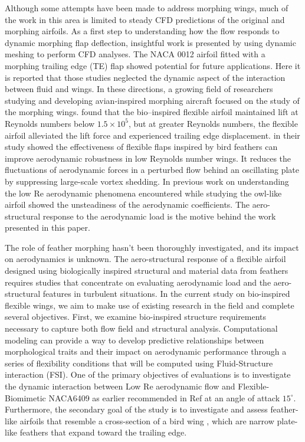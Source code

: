 \documentclass[conf]{new-aiaa}
\begin{document}
Although some attempts have been made to address morphing wings, much of the work in this area is limited to steady CFD predictions of the original and morphing airfoils.
%
As a first step to understanding how the flow responds to dynamic morphing flap deflection,  insightful work is presented by \cite{abdessemed2018morphing} using dynamic meshing to perform CFD analyses.
%
The NACA 0012 airfoil fitted with a morphing trailing edge (TE) flap showed potential for future applications. 
%
Here it is reported that those studies neglected the dynamic aspect of the interaction between fluid and wings.
%
In these directions, a growing field of researchers studying and developing avian-inspired morphing aircraft focused on the study of the morphing wings.
%
\citet{gamble2020aeroelastic} found that the bio--inspired flexible airfoil maintained lift at Reynolds numbers below $1.5\times 10^5$, but at greater Reynolds numbers, the flexible airfoil alleviated the lift force and experienced trailing edge displacement.
%
\citet{murayama2021flexible} in their study showed the effectiveness of flexible flaps inspired by bird feathers can improve aerodynamic robustness in low Reynolds number wings.
%
It reduces the fluctuations of aerodynamic forces in a perturbed flow behind an oscillating plate by suppressing large-scale vortex shedding. 
%
In previous work on understanding the low Re aerodynamic phenomena encountered while studying the owl-like airfoil \cite{boughou2022low} showed the unsteadiness of the aerodynamic coefficients.
%
The aero-structural response to the aerodynamic load is the motive behind the work presented in this paper.

The role of feather morphing hasn't been thoroughly investigated, and its impact on aerodynamics is unknown. 
%
The aero-structural response of a flexible airfoil designed using biologically inspired structural and material data from feathers requires studies that concentrate on evaluating aerodynamic load and the aero-structural features in turbulent situations.
%
In the current study on bio-inspired flexible wings, we aim to make use of existing research in the field and complete several objectives. 
%
First, we examine bio-inspired structure requirements  necessary to capture both flow field and structural analysis. 
%
Computational modeling can provide a way to develop predictive relationships between morphological traits and their impact on aerodynamic performance through a series of flexibility conditions that will be computed using Fluid-Structure interaction (FSI).
%
One of the primary objectives of evaluations is to investigate the dynamic interaction between Low Re aerodynamic flow and Flexible-Biomimetic NACA6409 as earlier recommended in Ref \cite{gamble2020load} at an angle of attack $15^{\circ}$.
% 
Furthermore, the secondary goal of the study is to investigate and assess feather-like airfoils that resemble a cross-section of a bird wing \cite{murayama2021flexible}, which are narrow plate-like feathers that expand toward the trailing edge. 
\end{document}

